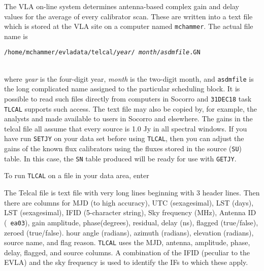 
The VLA on-line system determines antenna-based complex gain and delay
values for the average of every calibrator scan.  These are written
into a text file which is stored at the VLA site on a computer named
{\tt mchammer}.  The actual file name is\\
\centerline{{\tt /home/mchammer/evladata/telcal/{\it year}/{\it
      month}/{\it asdmfile}.GN}}\\
where {\it year} is the four-digit year, {\it month} is the two-digit
month, and {\tt asdmfile} is the long complicated name assigned to the
particular scheduling block.  It is possible to read such files
directly from computers in Socorro and {\tt 31DEC18} task {\tt TLCAL}
supports such access.  The text file may also be copied by, for
example, the analysts and made available to users in Socorro and
elsewhere.  The gains in the telcal file all assume that every source
is 1.0 Jy in all spectral windows.  If you have run {\tt SETJY} on
your data set before using {\tt TLCAL}, then you can adjust the gains
of the known flux calibrators using the fluxes stored in the source
({\tt SU}) table.  In this case, the {\tt SN} table produced will be
ready for use with {\tt GETJY}\@.

To run {\tt TLCAL} on a file in your data area, enter

The Telcal file is text file with very long lines beginning with 3
header lines.  Then there are columns for MJD (to high accuracy), UTC
(sexagesimal), LST (days), LST (sexagesimal), IFID (5-character
string), Sky frequency (MHz), Antenna ID (\eg\ {\tt ea03}), gain
amplitude, phase(degrees), residual, delay (ns), flagged (true/false),
zeroed (true/false). hour angle (radians), azimuth (radians),
elevation (radians), source name, and flag reason.  {\tt TLCAL} uses
the MJD, antenna, amplitude, phase, delay, flagged, and source
columns.  A combination of the IFID (peculiar to the EVLA) and the sky
frequency is used to identify the IFs to which these apply.

